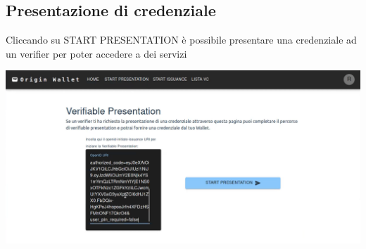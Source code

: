 \subsection{Presentazione di credenziale}
Cliccando su START PRESENTATION è possibile presentare una credenziale ad un verifier per poter accedere a dei servizi
\begin{center}
\includegraphics[scale = 0.9]{./res/img/wallet/wallet_start_presentation.png}
\end{center}
